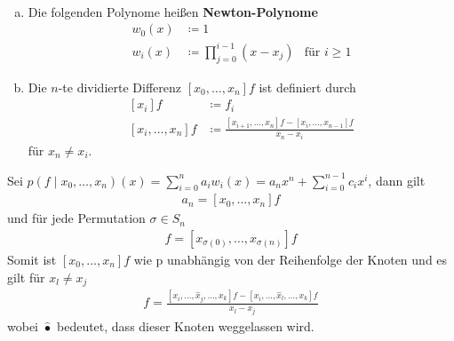 \begin{Defe}~
  \begin{enumerate}[a)]
  \item Die folgenden Polynome heißen \textbf{Newton-Polynome}
    \begin{align*}
      w_0(x) &\coloneqq 1\\
      w_i(x) &\coloneqq \prod_{j=0}^{i-1} (x-x_j)
             &\text{für } i\geq 1
    \end{align*}
  \item Die $n$-te dividierte Differenz $[x_0,\dots , x_n]f$
    ist definiert durch
    \begin{align}\nonumber
      [x_i]f &\coloneqq f_i\\
      [x_i,\dots, x_n]f 
             &\coloneqq
               \frac{[x_{i+1},\dots,x_n]f-[x_i,\dots,x_{n-1}]f}
               {x_n-x_i}
               \label{VI.1.11}
    \end{align}
    für $x_n\neq x_i$.
  \end{enumerate}
\end{Defe}


\begin{Satze}\label{6.1.6}
  Sei $p(f\mid  x_0,\dots ,x_n)(x)=\sum_{i=0}^{n}a_iw_i(x) = 
  a_nx^n+ \sum_{i=0}^{n-1}c_ix^i$, dann gilt
  \begin{gather*}
    a_n= [x_0, \dots, x_n]f
  \end{gather*}
  und für jede Permutation $\sigma \in S_n$
  \begin{gather*}
    [x_0,\dots, x_n]f= [x_{\sigma(0)},\dots , x_{\sigma(n)}]f
  \end{gather*}
  Somit ist $[x_0, \dots, x_n]f$ wie p unabhängig von der
  Reihenfolge der Knoten und es gilt für $x_l\neq x_j$
  \begin{gather}
    [x_i, \dots, x_k] f= \frac{[x_i,\dots,\widehat{x}_j,\dots,x_k]f
      -[x_i,\dots,\widehat{x}_l,\dots,x_k]f}
    {x_l-x_j}
    \label{VI.1.12}
  \end{gather}
  wobei $\widehat{\bullet}$ bedeutet, dass dieser Knoten
  weggelassen wird.
\end{Satze}

